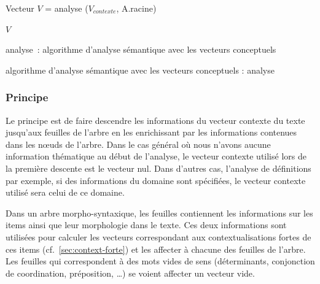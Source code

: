 \begin{algorithm}[h]
   
  
  Vecteur $V$ = analyse ($V_{contexte}$, A.racine)
  
   \Retour $V$
\caption{analyse~: algorithme d'analyse sémantique avec les vecteurs conceptuels}
  \label{algo:AS-VC1}
\end{algorithm}
  
\begin{algorithm}[h]
    
\caption{algorithme d'analyse sémantique avec les vecteurs conceptuels
  : analyse}
  \label{algo:AS-VC2}
\end{algorithm}


\subsubsection{Principe}
Le principe est de faire descendre les informations du vecteur
contexte du texte jusqu'aux feuilles de l'arbre en les enrichissant
par les informations contenues dans les n\oe uds de l'arbre.  Dans le
cas général où nous n'avons aucune information thématique au début de
l'analyse, le vecteur contexte utilisé lors de la première descente
est le vecteur nul. Dans d'autres cas, l'analyse de définitions par
exemple, si des informations du domaine sont spécifiées, le vecteur
contexte utilisé sera celui de ce domaine.

Dans un arbre morpho-syntaxique, les feuilles contiennent les
informations sur les items ainsi que leur morphologie dans le texte.
Ces deux informations sont utilisées pour calculer les vecteurs
correspondant aux contextualisations fortes de ces items
(cf.~\ref{sec:context-forte}) et les affecter à chacune des feuilles
de l'arbre. Les feuilles qui correspondent à des mots vides de sens
(déterminants, conjonction de coordination, préposition, \ldots) se
voient affecter un vecteur vide.

